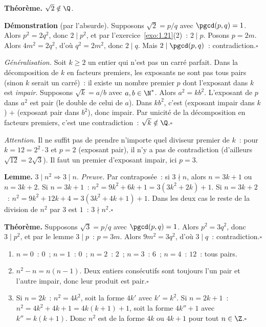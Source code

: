 
\textbf{Th\'eor\`eme.} $\sqrt{2}\notin\Q$.

\textbf{D\'emonstration} (par l'absurde). Supposons $\sqrt{2}=p/q$ avec $\pgcd(p,q)=1$.
Alors $p^2=2q^2$, donc $2\mid p^2$, et par l'exercice~\ref{exo:1.21}(2)~: $2\mid p$.
Posons $p=2m$. Alors $4m^2=2q^2$, d'o\`u $q^2=2m^2$, donc $2\mid q$.
Mais $2\mid\pgcd(p,q)$~: contradiction.\hfill$\square$

\textit{G\'en\'eralisation.} Soit $k\geq2$ un entier qui n'est pas un carr\'e parfait.
Dans la d\'ecomposition de $k$ en facteurs premiers, les exposants ne sont pas tous pairs
(sinon $k$ serait un carr\'e)~: il existe un nombre premier $p$ dont l'exposant dans $k$ est \emph{impair}.
Supposons $\sqrt{k}=a/b$ avec $a,b\in\N^*$. Alors $a^2=kb^2$.
L'exposant de $p$ dans $a^2$ est pair (le double de celui de $a$).
Dans $kb^2$, c'est (exposant impair dans $k$) $+$ (exposant pair dans $b^2$), donc impair.
Par unicit\'e de la d\'ecomposition en facteurs premiers, c'est une contradiction~:
$\sqrt{k}\notin\Q$.\hfill$\square$

\textit{Attention.} Il ne suffit pas de prendre n'importe quel diviseur premier de $k$~:
pour $k=12=2^2\cdot3$ et $p=2$ (exposant pair), il n'y a pas de contradiction
(d'ailleurs $\sqrt{12}=2\sqrt{3}$). Il faut un premier d'exposant impair, ici $p=3$.


\textbf{Lemme.} $3\mid n^2\Rightarrow3\mid n$.
\emph{Preuve.} Par contrapos\'ee~: si $3\nmid n$, alors $n=3k+1$ ou $n=3k+2$.
Si $n=3k+1$~: $n^2=9k^2+6k+1=3(3k^2+2k)+1$.
Si $n=3k+2$~: $n^2=9k^2+12k+4=3(3k^2+4k+1)+1$.
Dans les deux cas le reste de la division de $n^2$ par $3$ est $1$~: $3\nmid n^2$.\hfill$\square$

\textbf{Th\'eor\`eme.} Supposons $\sqrt{3}=p/q$ avec $\pgcd(p,q)=1$.
Alors $p^2=3q^2$, donc $3\mid p^2$, et par le lemme $3\mid p$~: $p=3m$.
Alors $9m^2=3q^2$, d'o\`u $3\mid q$~: contradiction.\hfill$\square$


\begin{enumerate}
  \item $n=0$~: $0$~; $n=1$~: $0$~; $n=2$~: $2$~; $n=3$~: $6$~; $n=4$~: $12$~: tous pairs.\checkmark
  \item $n^2-n=n(n-1)$. Deux entiers cons\'ecutifs sont toujours l'un pair et l'autre impair,
        donc leur produit est pair.\hfill$\square$
  \item Si $n=2k$~: $n^2=4k^2$, soit la forme $4k'$ avec $k'=k^2$.
        Si $n=2k+1$~: $n^2=4k^2+4k+1=4k(k+1)+1$, soit la forme $4k''+1$ avec $k''=k(k+1)$.
        Donc $n^2$ est de la forme $4k$ ou $4k+1$ pour tout $n\in\Z$.\hfill$\square$
\end{enumerate}

